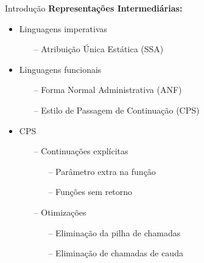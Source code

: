 \begin{frame}{Introdução}
    \textbf{Representações Intermediárias:}
    \begin{itemize}
        \item Linguagens imperativas
              \begin{itemize}
                  \item[--] Atribuição Única Estática (SSA)
              \end{itemize}
        \item Linguagens funcionais
              \begin{itemize}
                  \item[--] Forma Normal Administrativa (ANF)
                  \item[--] Estilo de Passagem de Continuação (CPS)
              \end{itemize}
        \item CPS
              \begin{itemize}
                  \item[--] Continuações explícitas
                        \begin{itemize}
                            \item[--] Parâmetro extra na função
                            \item[--] Funções sem retorno
                        \end{itemize}
                  \item[--] Otimizações
                        \begin{itemize}
                            \item[--] Eliminação da pilha de chamadas
                            \item[--] Eliminação de chamadas de cauda
                        \end{itemize}
              \end{itemize}
    \end{itemize}
\end{frame}

